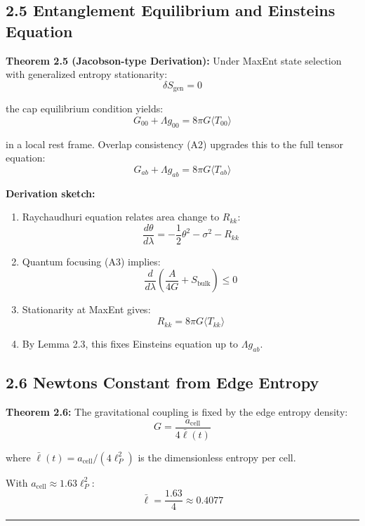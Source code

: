 \subsection{2.5 Entanglement Equilibrium and Einstein\textquotesingle s Equation}\label{25-entanglement-equilibrium-and-einsteins-equation}

\textbf{Theorem 2.5 (Jacobson-type Derivation):} Under MaxEnt state selection with generalized entropy stationarity: \[\delta S_{\text{gen}} = 0\]

the cap equilibrium condition yields: \[G_{00} + \Lambda g_{00} = 8\pi G \langle T_{00} \rangle\]

in a local rest frame. Overlap consistency (A2) upgrades this to the full tensor equation: \[G_{ab} + \Lambda g_{ab} = 8\pi G \langle T_{ab} \rangle\]

\textbf{Derivation sketch:}

\begin{enumerate}
\def\labelenumi{\arabic{enumi}.}
\item
  Raychaudhuri equation relates area change to \(R_{kk}\): \[\frac{d\theta}{d\lambda} = -\frac{1}{2}\theta^2 - \sigma^2 - R_{kk}\]
\item
  Quantum focusing (A3) implies: \[\frac{d}{d\lambda}\left(\frac{A}{4G} + S_{\text{bulk}}\right) \leq 0\]
\item
  Stationarity at MaxEnt gives: \[R_{kk} = 8\pi G \langle T_{kk} \rangle\]
\item
  By Lemma 2.3, this fixes Einstein\textquotesingle s equation up to \(\Lambda g_{ab}\).
\end{enumerate}

\subsection{2.6 Newton\textquotesingle s Constant from Edge Entropy}\label{26-newtons-constant-from-edge-entropy}

\textbf{Theorem 2.6:} The gravitational coupling is fixed by the edge entropy density: \[G = \frac{a_{\text{cell}}}{4\bar{\ell}(t)}\]

where \(\bar{\ell}(t) = a_{\text{cell}}/(4\ell_P^2)\) is the dimensionless entropy per cell.

With \(a_{\text{cell}} \approx 1.63 \ell_P^2\): \[\bar{\ell} = \frac{1.63}{4} \approx 0.4077\]

\begin{center}\rule{0.5\linewidth}{0.5pt}\end{center}

